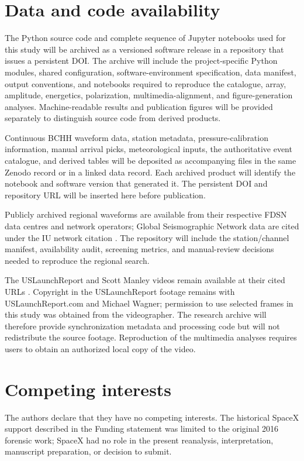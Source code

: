 \documentclass[]{seismica}
\begin{document}
\section*{Data and code availability}

The Python source code and complete sequence of Jupyter notebooks used for this
study will be archived as a versioned software release in a repository that
issues a persistent DOI. The archive will include the project-specific Python
modules, shared configuration, software-environment specification, data
manifest, output conventions, and notebooks required to reproduce the
catalogue, array, amplitude, energetics, polarization, multimedia-alignment,
and figure-generation analyses. Machine-readable results and publication
figures will be provided separately to distinguish source code from derived
products.

Continuous BCHH waveform data, station metadata, pressure-calibration information, manual arrival picks, meteorological inputs, the authoritative event catalogue, and derived tables will be deposited as accompanying files in the same Zenodo record or in a linked data record. Each archived product will identify the notebook and software version that generated it. The persistent DOI and repository URL will be inserted here before publication.

Publicly archived regional waveforms are available from their respective FDSN
data centres and network operators; Global Seismographic Network data are
cited under the IU network citation \citep{asl_gsn_iu_1988}. The repository
will include the station/channel manifest, availability audit, screening
metrics, and manual-review decisions needed to reproduce the regional search.

The USLaunchReport and Scott Manley videos remain available at their cited URLs \citep{uslaunchreport_amos6_video_2016,manley_spacex_explosion_2016}. Copyright in the USLaunchReport footage remains with USLaunchReport.com and Michael Wagner; permission to use selected frames in this study was obtained from the videographer. The research archive will therefore provide synchronization metadata and processing code but will not redistribute the source footage. Reproduction of the multimedia analyses requires users to obtain an authorized local copy of the video.

\section*{Competing interests}

The authors declare that they have no competing interests. The historical
SpaceX support described in the Funding statement was limited to the original
2016 forensic work; SpaceX had no role in the present reanalysis,
interpretation, manuscript preparation, or decision to submit.


\end{document}
